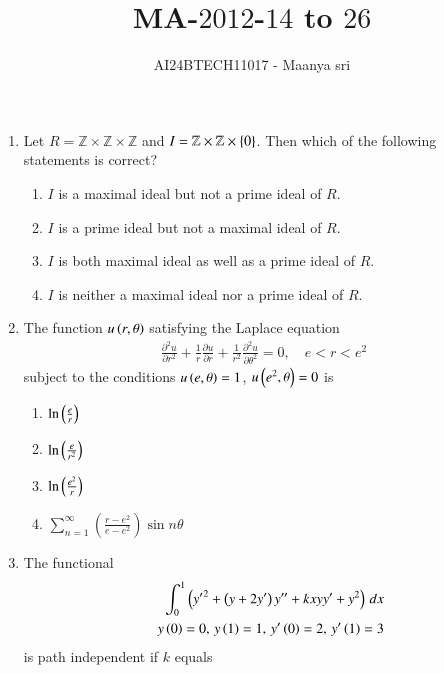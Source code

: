 \documentclass[journal,12pt,twocolumn]{IEEEtran}
\theoremstyle{remark}
\begin{document}

\vspace{3cm}

\title{MA-$2012$-$14$ to $26$}
\author{AI24BTECH11017 - Maanya sri}
\maketitle
\newpage
\bigskip

\renewcommand{\thefigure}{\theenumi}
\renewcommand{\thetable}{\theenumi}
\begin{enumerate} 

	\item Let $R = \mathbb{Z} \times \mathbb{Z} \times \mathbb{Z}$ and $I = \mathbb{Z} \times \mathbb{Z} \times \left\{0\right\}$.  
Then which of the following statements is correct?

\begin{enumerate}
    \item $I$ is a maximal ideal but not a prime ideal of $R$.
    \item $I$ is a prime ideal but not a maximal ideal of $R$.
    \item $I$ is both maximal ideal as well as a prime ideal of $R$.
    \item $I$ is neither a maximal ideal nor a prime ideal of $R$.
\end{enumerate}

\item The function $u \left(r, \theta\right)$ satisfying the Laplace equation
\begin{align}
\frac{\partial^2 u}{\partial r^2} + \frac{1}{r} \frac{\partial u}{\partial r} + \frac{1}{r^2} \frac{\partial^2 u}{\partial \theta^2} = 0, \quad e < r < e^2
\end{align}
subject to the conditions $u \left(e, \theta\right) = 1$, $u \left(e^2, \theta\right) = 0$ is

\begin{enumerate}
    \item $\ln \left(\frac{e}{r}\right)$
    \item $\ln \left(\frac{e}{r^2}\right)$
    \item $\ln \left(\frac{e^2}{r}\right)$
    \item $\sum_{n=1}^{\infty} \left( \frac{r - e^2}{e - e^2} \right) \sin n\theta$
\end{enumerate}

\item The functional
\begin{align}
	\int_{0}^{1} \left( {y^{\prime}}^2 + \left(y + 2y^{\prime}\right) y^{\prime \prime} + kxyy^{\prime} + y^2 \right) \, dx 
	\\ \quad y \left(0\right) = 0, \, y \left(1\right) = 1, \, y^\prime \left(0\right) = 2, \, y^\prime \left(1\right) = 3
\end{align}
is path independent if $k$ equals


\end{enumerate}
\end{document}
